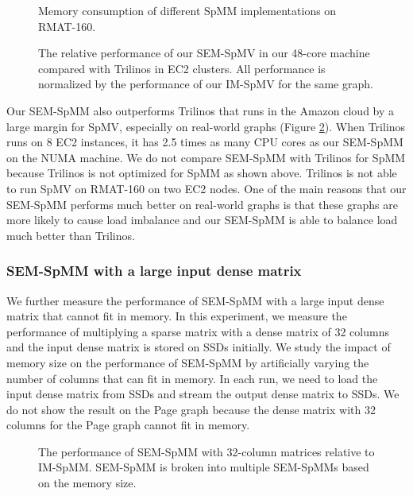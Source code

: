 \begin{figure}
	\begin{center}
		\footnotesize
		
		\caption{Memory consumption of different SpMM implementations on
		RMAT-160.}
		\label{perf:spmm_mem}
	\end{center}
\end{figure}

\begin{figure}
	\begin{center}
		\footnotesize
		
		\caption{The relative performance of our SEM-SpMV in our 48-core
			machine compared with Trilinos in EC2 clusters. All performance
			is normalized by the performance of our IM-SpMV for the same
			graph.}
		\label{perf:ec2}
	\end{center}
\end{figure}

Our SEM-SpMM also outperforms Trilinos that runs in the Amazon cloud by a large
margin for SpMV, especially on real-world graphs (Figure \ref{perf:ec2}).
When Trilinos runs on 8 EC2 instances, it has 2.5 times as many CPU cores as
our SEM-SpMM on the NUMA machine. We do not compare SEM-SpMM with Trilinos
for SpMM because Trilinos is not optimized for SpMM as shown above. Trilinos
is not able to run SpMV on RMAT-160 on two EC2 nodes.
One of the main reasons that our SEM-SpMM performs much
better on real-world graphs is that these graphs are more likely to cause
load imbalance and our SEM-SpMM is able to balance load much better than
Trilinos.

\subsubsection{SEM-SpMM with a large input dense matrix}

We further measure the performance of SEM-SpMM with a large input dense matrix
that cannot fit in memory. In this experiment, we measure the performance of
multiplying a sparse matrix with a dense matrix of 32 columns and the input
dense matrix is stored on SSDs initially. We study the impact of memory size
on the performance of SEM-SpMM by artificially varying the number of columns
that can fit in memory. In each run, we need to load the input dense matrix from
SSDs and stream the output dense matrix to SSDs. We do not show the result on
the Page graph because the dense matrix with 32 columns for the Page graph
cannot fit in memory.

\begin{figure}
	\begin{center}
		\footnotesize
		
		\caption{The performance of SEM-SpMM with 32-column matrices
			relative to IM-SpMM. SEM-SpMM is broken into multiple SEM-SpMMs
		based on the memory size.}
		\label{perf:spmm32}
	\end{center}
\end{figure}

